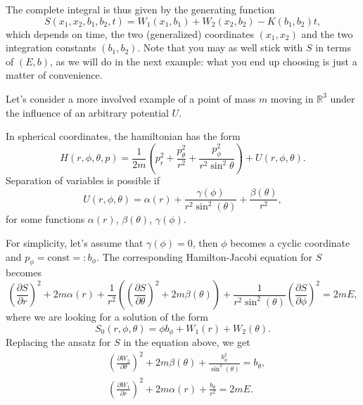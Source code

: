 \documentclass[english,fontsize=11pt,paper=a5,oneside]{scrbook}
\newcommand{\R}{\mathbb{R}}
\theoremstyle{definition}
\newenvironment{example}
  {\pushQED{\qed}\renewcommand{\qedsymbol}{$\lozenge$}\examplex}
  {\popQED\endexamplex}
\begin{document}
\begin{example}[Planar harmonic oscillator]
    The complete integral is thus given by the generating function
    \begin{equation}
        S(x_1,x_2,b_1,b_2,t) = W_1(x_1, b_1) + W_2(x_2,b_2) - K(b_1, b_2) t,
    \end{equation}
    which depends on time, the two (generalized) coordinates $(x_1, x_2)$ and the two integration constants $(b_1, b_2)$.
    Note that you may as well stick with $S$ in terms of $(E, b)$, as we will do in the next example: what you end up choosing is just a matter of convenience.
\end{example}

\begin{example}\label{ex:kepler3dseparable}
    Let's consider a more involved example of a point of mass $m$ moving in $\R^3$ under the influence of an arbitrary potential $U$.

    In spherical coordinates, the hamiltonian has the form
    \begin{equation}
        H(r,\phi,\theta, p) = \frac{1}{2m}\left(p_r^2 + \frac{p_\theta^2}{r^2} + \frac{p_\phi^2}{r^2\sin^2\theta}\right)
        + U(r,\phi,\theta).
    \end{equation}
    Separation of variables is possible if
    \begin{equation}
        U(r,\phi,\theta) = \alpha(r) + \frac{\gamma(\phi)}{r^2 \sin^2(\theta)} + \frac{\beta(\theta)}{r^2},
    \end{equation}
    for some functions $\alpha(r)$, $\beta(\theta)$, $\gamma(\phi)$.

    For simplicity, let's assume that $\gamma(\phi) = 0$, then $\phi$ becomes a cyclic coordinate and $p_\phi = \mathrm{const} =: b_\phi$.
    The corresponding Hamilton-Jacobi equation for $S$ becomes
    \begin{equation}
        \left(\frac{\partial S}{\partial r}\right)^2 + 2m\alpha(r)
        + \frac{1}{r^2}\left(
            \left(\frac{\partial S}{\partial \theta}\right)^2 + 2m\beta(\theta)
        \right)
        + \frac{1}{r^2\sin^2(\theta)}\left(\frac{\partial S}{\partial \phi}\right)^2 = 2mE,
    \end{equation}
    where we are looking for a solution of the form
    \begin{equation}
        S_0(r,\phi,\theta) = \phi b_\phi + W_1(r) + W_2(\theta).
    \end{equation}
    Replacing the ansatz for $S$ in the equation above, we get
    \begin{align}
        &\left(\frac{\partial W_2}{\partial \theta}\right)^2 + 2m \beta(\theta) + \frac{b_\phi^2}{\sin^2(\theta)} = b_\theta,\\
        &\left(\frac{\partial W_1}{\partial r}\right)^2 + 2m \alpha(r) + \frac{b_\theta}{r^2} = 2mE.
    \end{align}


\end{example}
\end{document}
